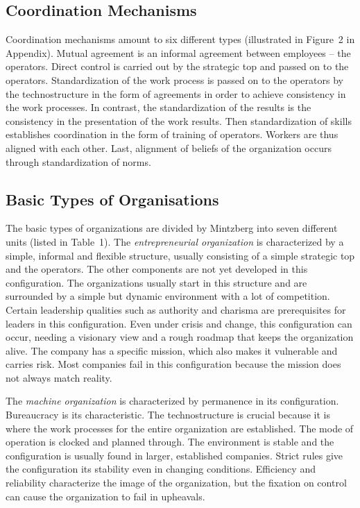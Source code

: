 \documentclass[a4paper,12pt]{article}
\begin{document}
\subsection{Coordination Mechanisms}

Coordination mechanisms amount to six different types (illustrated in Figure~2
in Appendix). Mutual agreement is an informal agreement between employees --
the operators. Direct control is carried out by the strategic top and passed
on to the operators. Standardization of the work process is passed on to the
operators by the technostructure in the form of agreements in order to achieve
consistency in the work processes. In contrast, the standardization of the
results is the consistency in the presentation of the work results. Then
standardization of skills establishes coordination in the form of training of
operators. Workers are thus aligned with each other. Last, alignment of
beliefs of the organization occurs through standardization of norms.

\subsection{Basic Types of Organisations}

The basic types of organizations are divided by Mintzberg into seven different
units (listed in Table~1). The \emph{entrepreneurial organization} is
characterized by a simple, informal and flexible structure, usually consisting
of a simple strategic top and the operators. The other components are not yet
developed in this configuration. The organizations usually start in this
structure and are surrounded by a simple but dynamic environment with a lot of
competition.  Certain leadership qualities such as authority and charisma are
prerequisites for leaders in this configuration. Even under crisis and change,
this configuration can occur, needing a visionary view and a rough roadmap
that keeps the organization alive. The company has a specific mission, which
also makes it vulnerable and carries risk. Most companies fail in this
configuration because the mission does not always match reality.

The \emph{machine organization} is characterized by permanence in its
configuration. Bureaucracy is its characteristic. The technostructure is
crucial because it is where the work processes for the entire organization are
established. The mode of operation is clocked and planned through. The
environment is stable and the configuration is usually found in larger,
established companies. Strict rules give the configuration its stability even
in changing conditions. Efficiency and reliability characterize the image of
the organization, but the fixation on control can cause the organization to
fail in upheavals.
\end{document}
